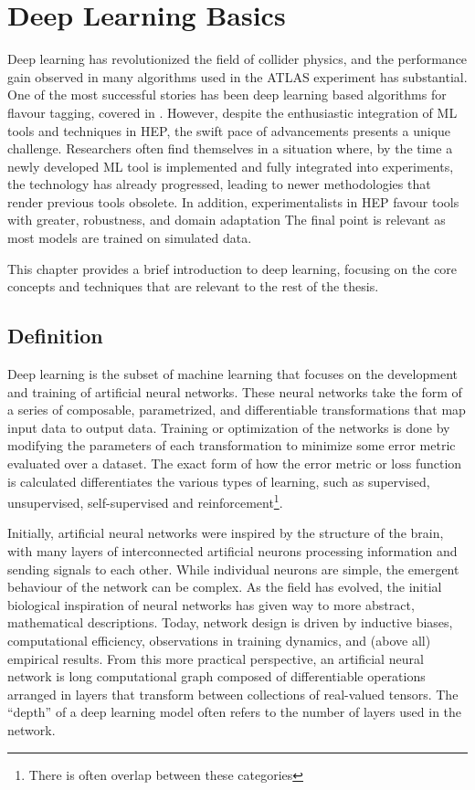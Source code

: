 \chapter{Deep Learning Basics}
\label{ch:deep_learning}

Deep learning has revolutionized the field of collider physics, and the performance gain observed in many algorithms used in the ATLAS experiment has substantial.
One of the most successful stories has been deep learning based algorithms for flavour tagging, covered in .
However, despite the enthusiastic integration of ML tools and techniques in HEP, the swift pace of advancements presents a unique challenge.
Researchers often find themselves in a situation where, by the time a newly developed ML tool is implemented and fully integrated into experiments, the technology has already progressed, leading to newer methodologies that render previous tools obsolete.
In addition, experimentalists in HEP favour tools with greater, robustness, and domain adaptation
The final point is relevant as most models are trained on simulated data.

This chapter provides a brief introduction to deep learning, focusing on the core concepts and techniques that are relevant to the rest of the thesis.

\section{Definition}

Deep learning is the subset of machine learning that focuses on the development and training of artificial neural networks.
These neural networks take the form of a series of composable, parametrized, and differentiable transformations that map input data to output data.
Training or optimization of the networks is done by modifying the parameters of each transformation to minimize some error metric evaluated over a dataset.
The exact form of how the error metric or loss function is calculated differentiates the various types of learning, such as supervised, unsupervised, self-supervised and reinforcement\footnote{There is often overlap between these categories}.

Initially, artificial neural networks were inspired by the structure of the brain, with many layers of interconnected artificial neurons processing information and sending signals to each other.
While individual neurons are simple, the emergent behaviour of the network can be complex.
As the field has evolved, the initial biological inspiration of neural networks has given way to more abstract, mathematical descriptions.
Today, network design is driven by inductive biases, computational efficiency, observations in training dynamics, and (above all) empirical results.
From this more practical perspective, an artificial neural network is long computational graph composed of differentiable operations arranged in layers that transform between collections of real-valued tensors.
The ``depth'' of a deep learning model often refers to the number of layers used in the network.

